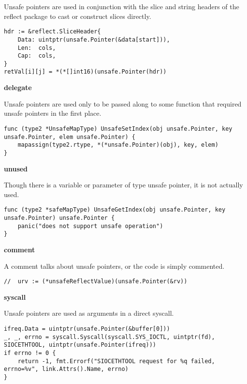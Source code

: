 Unsafe pointers are used in conjunction with the slice and string headers of the reflect package to cast or construct
slices directly.

\begin{lstlisting}[language=Golang, label=lst:survey-small-classexample-conversion-header, caption=Usage class example: conversion-header]
hdr := &reflect.SliceHeader{
    Data: uintptr(unsafe.Pointer(&data[start])),
    Len:  cols,
    Cap:  cols,
}
retVal[i][j] = *(*[]int16)(unsafe.Pointer(hdr))
\end{lstlisting}


\textbf{delegate}

Unsafe pointers are used only to be passed along to some function that required unsafe pointers in the first place.

\begin{lstlisting}[language=Golang, label=lst:survey-small-classexample-delegate, caption=Usage class example: delegate]
func (type2 *UnsafeMapType) UnsafeSetIndex(obj unsafe.Pointer, key unsafe.Pointer, elem unsafe.Pointer) {
    mapassign(type2.rtype, *(*unsafe.Pointer)(obj), key, elem)
}
\end{lstlisting}


\textbf{unused}

Though there is a variable or parameter of type unsafe pointer, it is not actually used.

\begin{lstlisting}[language=Golang, label=lst:survey-small-classexample-unused, caption=Usage class example: unused]
func (type2 *safeMapType) UnsafeGetIndex(obj unsafe.Pointer, key unsafe.Pointer) unsafe.Pointer {
    panic("does not support unsafe operation")
}
\end{lstlisting}


\textbf{comment}

A comment talks about unsafe pointers, or the code is simply commented.

\begin{lstlisting}[language=Golang, label=lst:survey-small-classexample-comment, caption=Usage class example: comment]
// 	urv := (*unsafeReflectValue)(unsafe.Pointer(&rv))
\end{lstlisting}


\textbf{syscall}

Unsafe pointers are used as arguments in a direct syscall.

\begin{lstlisting}[language=Golang, label=lst:survey-small-classexample-syscall, caption=Usage class example: syscall]
ifreq.Data = uintptr(unsafe.Pointer(&buffer[0]))
_, _, errno = syscall.Syscall(syscall.SYS_IOCTL, uintptr(fd), SIOCETHTOOL, uintptr(unsafe.Pointer(ifreq)))
if errno != 0 {
    return -1, fmt.Errorf("SIOCETHTOOL request for %q failed, errno=%v", link.Attrs().Name, errno)
}
\end{lstlisting}


